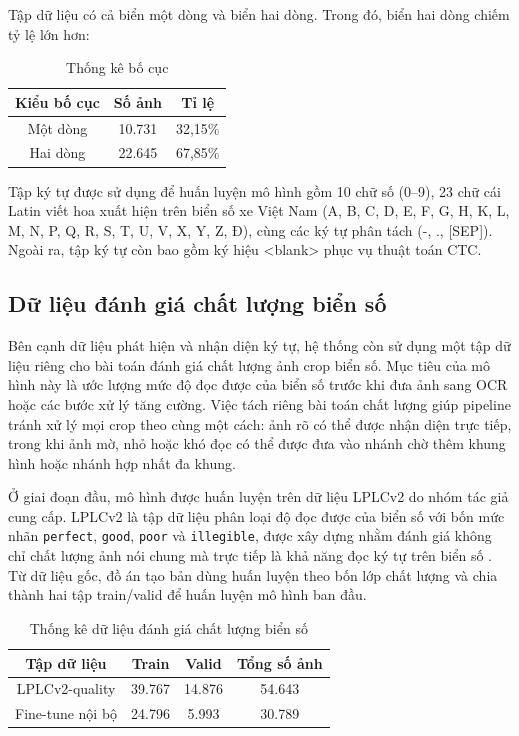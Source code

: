 \documentclass[../DoAn.tex]{subfiles}
\begin{document}
Tập dữ liệu có cả biển một dòng và biển hai dòng. Trong đó, biển hai dòng chiếm tỷ lệ lớn hơn:
\begin{table}[htbp]
\centering
\caption{Thống kê bố cục}
\begin{tabular}{|c|c|c|}
\hline
Kiểu bố cục & Số ảnh & Tỉ lệ \\
\hline
Một dòng & 10.731 & 32,15\% \\
Hai dòng & 22.645 & 67,85\% \\
\hline
\end{tabular}
\end{table}

Tập ký tự được sử dụng để huấn luyện mô hình gồm 10 chữ số (0–9), 23 chữ cái Latin viết hoa xuất hiện trên biển số xe Việt Nam (A, B, C, D, E, F, G, H, K, L, M, N, P, Q, R, S, T, U, V, X, Y, Z, Đ), cùng các ký tự phân tách (-, ., [SEP]). Ngoài ra, tập ký tự còn bao gồm ký hiệu <blank> phục vụ thuật toán CTC.
\subsection{Dữ liệu đánh giá chất lượng biển số}
\label{subsection:4.data.3}

Bên cạnh dữ liệu phát hiện và nhận diện ký tự, hệ thống còn sử dụng một tập dữ liệu riêng cho bài toán đánh giá chất lượng ảnh crop biển số. Mục tiêu của mô hình này là ước lượng mức độ đọc được của biển số trước khi đưa ảnh sang OCR hoặc các bước xử lý tăng cường. Việc tách riêng bài toán chất lượng giúp pipeline tránh xử lý mọi crop theo cùng một cách: ảnh rõ có thể được nhận diện trực tiếp, trong khi ảnh mờ, nhỏ hoặc khó đọc có thể được đưa vào nhánh chờ thêm khung hình hoặc nhánh hợp nhất đa khung.

Ở giai đoạn đầu, mô hình được huấn luyện trên dữ liệu LPLCv2 do nhóm tác giả cung cấp. LPLCv2 là tập dữ liệu phân loại độ đọc được của biển số với bốn mức nhãn  \texttt{perfect},  \texttt{good},  \texttt{poor} và  \texttt{illegible}, được xây dựng nhằm đánh giá không chỉ chất lượng ảnh nói chung mà trực tiếp là khả năng đọc ký tự trên biển số \cite{wojcik2026lplcv2}. Từ dữ liệu gốc, đồ án tạo bản dùng huấn luyện theo bốn lớp chất lượng và chia thành hai tập train/valid để huấn luyện mô hình ban đầu.

\begin{table}[htbp]
\centering
\caption{Thống kê dữ liệu đánh giá chất lượng biển số}
\begin{tabular}{|c|c|c|c|}
\hline
Tập dữ liệu & Train & Valid & Tổng số ảnh \\
\hline
LPLCv2-quality & 39.767 & 14.876 & 54.643 \\
Fine-tune nội bộ & 24.796 & 5.993 & 30.789 \\
\hline
\end{tabular}
\end{table}
\end{document}
